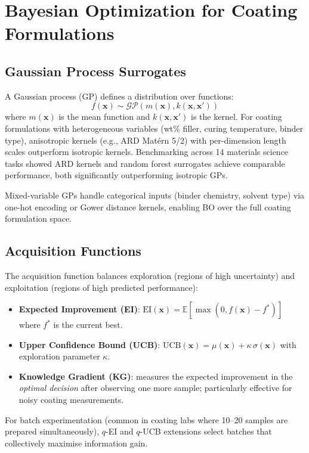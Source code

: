 \documentclass[11pt,a4paper]{article}
\begin{document}
\section{Bayesian Optimization for Coating Formulations}
\label{sec:bayesopt}

\subsection{Gaussian Process Surrogates}

A Gaussian process (GP) defines a distribution over functions:
\begin{equation}
f(\mathbf{x}) \sim \mathcal{GP}(m(\mathbf{x}), k(\mathbf{x}, \mathbf{x}'))
\end{equation}
where $m(\mathbf{x})$ is the mean function and $k(\mathbf{x}, \mathbf{x}')$ is the kernel.
For coating formulations with heterogeneous variables (wt\% filler, curing temperature, binder type), anisotropic kernels (e.g., ARD Mat\'ern 5/2) with per-dimension length scales outperform isotropic kernels.
Benchmarking across 14 materials science tasks showed ARD kernels and random forest surrogates achieve comparable performance, both significantly outperforming isotropic GPs.

Mixed-variable GPs handle categorical inputs (binder chemistry, solvent type) via one-hot encoding or Gower distance kernels, enabling BO over the full coating formulation space.

\subsection{Acquisition Functions}

The acquisition function balances exploration (regions of high uncertainty) and exploitation (regions of high predicted performance):
\begin{itemize}[nosep]
  \item \textbf{Expected Improvement (EI)}: $\text{EI}(\mathbf{x}) = \mathbb{E}[\max(0, f(\mathbf{x}) - f^*)]$ where $f^*$ is the current best.
  \item \textbf{Upper Confidence Bound (UCB)}: $\text{UCB}(\mathbf{x}) = \mu(\mathbf{x}) + \kappa\,\sigma(\mathbf{x})$ with exploration parameter $\kappa$.
  \item \textbf{Knowledge Gradient (KG)}: measures the expected improvement in the \emph{optimal decision} after observing one more sample; particularly effective for noisy coating measurements.
\end{itemize}
For batch experimentation (common in coating labs where 10--20 samples are prepared simultaneously), $q$-EI and $q$-UCB extensions select batches that collectively maximise information gain.
\end{document}
